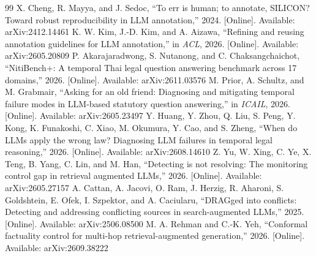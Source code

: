 \documentclass[preprint,3p,times]{elsarticle}
\begin{document}
\begin{thebibliography}{99}
 X. Cheng, R. Mayya, and J. Sedoc, ``To err is human; to annotate, SILICON? Toward robust reproducibility in LLM annotation,'' 2024. [Online]. Available: arXiv:2412.14461
 K. W. Kim, J.-D. Kim, and A. Aizawa, ``Refining and reusing annotation guidelines for LLM annotation,'' in \emph{ACL}, 2026. [Online]. Available: arXiv:2605.20809
 P. Akarajaradwong, S. Nutanong, and C. Chaksangchaichot, ``NitiBench+: A temporal Thai legal question answering benchmark across 17 domains,'' 2026. [Online]. Available: arXiv:2611.03576
 M. Prior, A. Schultz, and M. Grabmair, ``Asking for an old friend: Diagnosing and mitigating temporal failure modes in LLM-based statutory question answering,'' in \emph{ICAIL}, 2026. [Online]. Available: arXiv:2605.23497
 Y. Huang, Y. Zhou, Q. Liu, S. Peng, Y. Kong, K. Funakoshi, C. Xiao, M. Okumura, Y. Cao, and S. Zheng, ``When do LLMs apply the wrong law? Diagnosing LLM failures in temporal legal reasoning,'' 2026. [Online]. Available: arXiv:2608.14610
 Z. Yu, W. Xing, C. Ye, X. Teng, B. Yang, C. Lin, and M. Han, ``Detecting is not resolving: The monitoring control gap in retrieval augmented LLMs,'' 2026. [Online]. Available: arXiv:2605.27157
 A. Cattan, A. Jacovi, O. Ram, J. Herzig, R. Aharoni, S. Goldshtein, E. Ofek, I. Szpektor, and A. Caciularu, ``DRAGged into conflicts: Detecting and addressing conflicting sources in search-augmented LLMs,'' 2025. [Online]. Available: arXiv:2506.08500
 M. A. Rehman and C.-K. Yeh, ``Conformal factuality control for multi-hop retrieval-augmented generation,'' 2026. [Online]. Available: arXiv:2609.38222
\end{thebibliography}
\end{document}
